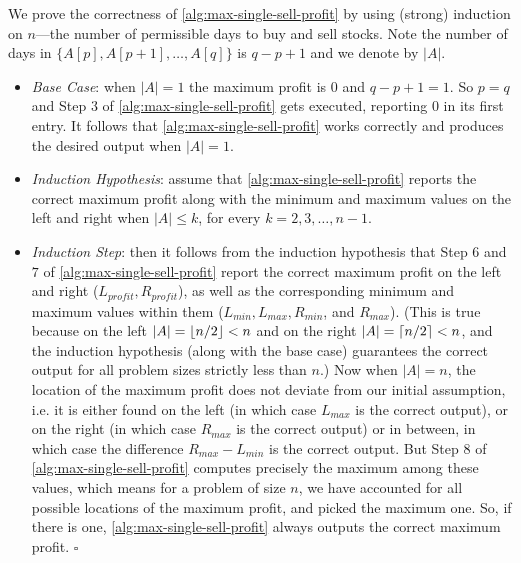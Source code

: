 \documentclass[10pt, letterpaper]{article}
\begin{document}
\begin{enumerate}[label={\bfseries Q\arabic*.}]
\begin{enumerate}
        We prove the correctness of \autoref{alg:max-single-sell-profit} by using (strong) induction on
        $n$---the number of permissible days to buy and sell stocks. Note the number of days in $\{A[p],
        A[p+1], \ldots, A[q]\}$ is $q - p  + 1$ and we denote by $|A|$. \\ \vspace{-2mm}

        \begin{itemize}[itemsep=10pt]
          \item
            {\itshape Base Case}: when $|A| = 1$ the maximum profit is $0$ and $q - p + 1 = 1$. So $p =
            q$ and Step $3$ of \autoref{alg:max-single-sell-profit} gets executed, reporting $0$ in its
            first entry. It follows that \autoref{alg:max-single-sell-profit} works correctly and produces
            the desired output when $|A| = 1$.

          \item
            {\itshape Induction Hypothesis}: assume that \autoref{alg:max-single-sell-profit} reports the
            correct maximum profit along with the minimum and maximum values on the left and right when
            $|A| \leq k$, for every $k = 2, 3, \ldots, n-1$.

          \item
            {\itshape Induction Step}: then it follows from the induction hypothesis that Step $6$ and $7$
            of \autoref{alg:max-single-sell-profit} report the correct maximum profit on the left and right
            ($L_{profit}, R_{profit}$), as well as the corresponding minimum and maximum values within them
            ($L_{min}, L_{max}, R_{min}$, and $R_{max}$). (This is true because on the left
            $|A| = \lfloor n/2 \rfloor < n$ and on the right $|A| = \lceil n/2 \rceil < n$, and the induction hypothesis
            (along with the base case) guarantees the correct output for all problem sizes strictly less
            than $n$.) Now when $|A| = n$, the location of the maximum profit does not deviate from our
            initial assumption, i.e. it is either found on the left (in which case $L_{max}$ is the correct
            output), or on the right (in which case $R_{max}$ is the correct output) or in between, in which case
            the difference $R_{max} - L_{min}$ is the correct output. But Step $8$ of \autoref{alg:max-single-sell-profit}
            computes precisely the maximum among these values, which means for a problem of size $n$,
            we have accounted for all possible locations of the maximum profit, and picked the maximum
            one. So, if there is one, \autoref{alg:max-single-sell-profit} always outputs the correct
            maximum profit. \hfill $\square$
      \end{itemize}
    \end{enumerate}
\end{enumerate}
\end{document}

